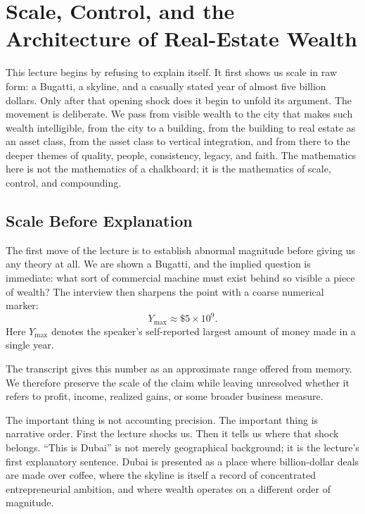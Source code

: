 \chapter{Scale, Control, and the Architecture of Real-Estate Wealth}

This lecture begins by refusing to explain itself. It first shows us scale in raw form: a Bugatti, a skyline, and a casually stated year of almost five billion dollars. Only after that opening shock does it begin to unfold its argument. The movement is deliberate. We pass from visible wealth to the city that makes such wealth intelligible, from the city to a building, from the building to real estate as an asset class, from the asset class to vertical integration, and from there to the deeper themes of quality, people, consistency, legacy, and faith. The mathematics here is not the mathematics of a chalkboard; it is the mathematics of scale, control, and compounding.

\section{Scale Before Explanation}

The first move of the lecture is to establish abnormal magnitude before giving us any theory at all. We are shown a Bugatti, and the implied question is immediate: what sort of commercial machine must exist behind so visible a piece of wealth? The interview then sharpens the point with a coarse numerical marker:
\begin{equation}
Y_{\max} \approx \$5 \times 10^{9}.
\end{equation}
Here \(Y_{\max}\) denotes the speaker's self-reported largest amount of money made in a single year.

\begin{remark}
The transcript gives this number as an approximate range offered from memory. We therefore preserve the scale of the claim while leaving unresolved whether it refers to profit, income, realized gains, or some broader business measure.
\end{remark}

The important thing is not accounting precision. The important thing is narrative order. First the lecture shocks us. Then it tells us where that shock belongs. ``This is Dubai'' is not merely geographical background; it is the lecture's first explanatory sentence. Dubai is presented as a place where billion-dollar deals are made over coffee, where the skyline is itself a record of concentrated entrepreneurial ambition, and where wealth operates on a different order of magnitude.

